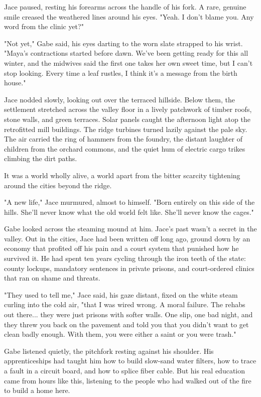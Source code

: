 Jace paused, resting his forearms across the handle of his fork. A rare, genuine smile creased the weathered lines around his eyes. "Yeah. I don't blame you. Any word from the clinic yet?"

"Not yet," Gabe said, his eyes darting to the worn slate strapped to his wrist. "Maya’s contractions started before dawn. We've been getting ready for this all winter, and the midwives said the first one takes her own sweet time, but I can't stop looking. Every time a leaf rustles, I think it's a message from the birth house."

Jace nodded slowly, looking out over the terraced hillside. Below them, the settlement stretched across the valley floor in a lively patchwork of timber roofs, stone walls, and green terraces. Solar panels caught the afternoon light atop the retrofitted mill buildings. The ridge turbines turned lazily against the pale sky. The air carried the ring of hammers from the foundry, the distant laughter of children from the orchard commons, and the quiet hum of electric cargo trikes climbing the dirt paths. 

It was a world wholly alive, a world apart from the bitter scarcity tightening around the cities beyond the ridge. 

"A new life," Jace murmured, almost to himself. "Born entirely on this side of the hills. She’ll never know what the old world felt like. She’ll never know the cages."

Gabe looked across the steaming mound at him. Jace’s past wasn't a secret in the valley. Out in the cities, Jace had been written off long ago, ground down by an economy that profited off his pain and a court system that punished how he survived it. He had spent ten years cycling through the iron teeth of the state: county lockups, mandatory sentences in private prisons, and court-ordered clinics that ran on shame and threats. 

"They used to tell me," Jace said, his gaze distant, fixed on the white steam curling into the cold air, "that I was wired wrong. A moral failure. The rehabs out there... they were just prisons with softer walls. One slip, one bad night, and they threw you back on the pavement and told you that you didn't want to get clean badly enough. With them, you were either a saint or you were trash."

Gabe listened quietly, the pitchfork resting against his shoulder. His apprenticeships had taught him how to build slow-sand water filters, how to trace a fault in a circuit board, and how to splice fiber cable. But his real education came from hours like this, listening to the people who had walked out of the fire to build a home here.

